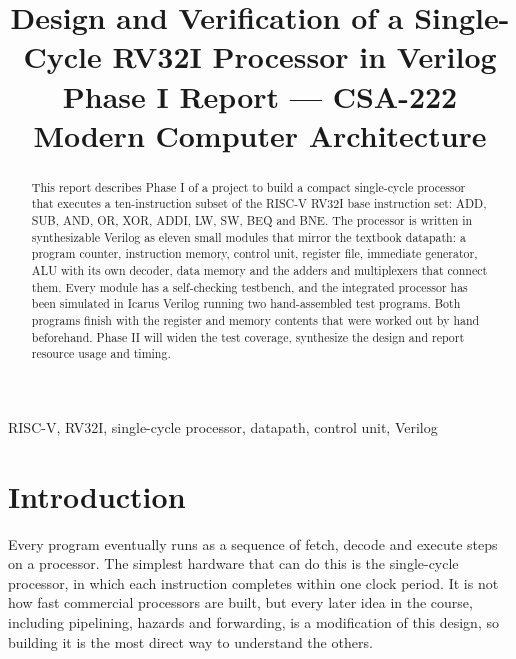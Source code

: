 \documentclass[conference]{IEEEtran}
\begin{document}
\title{Design and Verification of a Single-Cycle RV32I Processor in Verilog\\
{\large Phase I Report --- CSA-222 Modern Computer Architecture}}

\author{
}

\maketitle

\begin{abstract}
This report describes Phase I of a project to build a compact single-cycle
processor that executes a ten-instruction subset of the RISC-V RV32I base
instruction set: ADD, SUB, AND, OR, XOR, ADDI, LW, SW, BEQ and BNE. The
processor is written in synthesizable Verilog as eleven small modules that
mirror the textbook datapath: a program counter, instruction memory, control
unit, register file, immediate generator, ALU with its own decoder, data
memory and the adders and multiplexers that connect them. Every module has a
self-checking testbench, and the integrated processor has been simulated in
Icarus Verilog running two hand-assembled test programs. Both programs finish
with the register and memory contents that were worked out by hand
beforehand. Phase II will widen the test coverage, synthesize the design and
report resource usage and timing.
\end{abstract}

\begin{IEEEkeywords}
RISC-V, RV32I, single-cycle processor, datapath, control unit, Verilog
\end{IEEEkeywords}

\section{Introduction}
Every program eventually runs as a sequence of fetch, decode and execute steps
on a processor. The simplest hardware that can do this is the single-cycle
processor, in which each instruction completes within one clock period. It is
not how fast commercial processors are built, but every later idea in the
course, including pipelining, hazards and forwarding, is a modification of
this design, so building it is the most direct way to understand the others.
\end{document}

